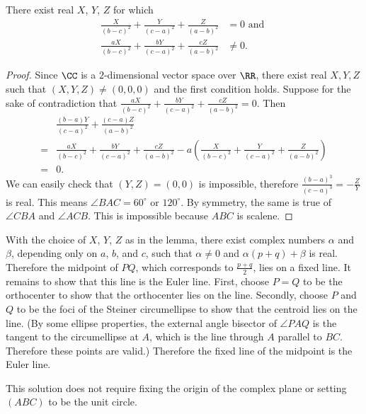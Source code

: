 \begin{lemma*}
  There exist real $X$, $Y$, $Z$ for which
  \begin{align*}
    \frac{X}{(b-c)^2}+\frac{Y}{(c-a)^2}+\frac{Z}{(a-b)^2} &= 0 \text{ and } \\
    \frac{aX}{(b-c)^2}+\frac{bY}{(c-a)^2}+\frac{cZ}{(a-b)^2} &\neq 0.
  \end{align*}
\end{lemma*}

\begin{proof}
  Since $\CC$ is a $2$-dimensional vector space over $\RR$, there
  exist real $X, Y, Z$ such that $(X, Y, Z)\neq (0, 0, 0)$ and the first
  condition holds. Suppose for the sake of contradiction that
  $\frac{aX}{(b-c)^2}+\frac{bY}{(c-a)^2}+\frac{cZ}{(a-b)^2}=0$. Then
  \begin{align*}
    & \frac{(b-a)Y}{(c-a)^2}+\frac{(c-a)Z}{(a-b)^2}\\
    =& \frac{aX}{(b-c)^2}+\frac{bY}{(c-a)^2}+\frac{cZ}{(a-b)^2} -
    a\left(\frac{X}{(b-c)^2}+\frac{Y}{(c-a)^2}+\frac{Z}{(a-b)^2}\right) \\
    =& 0.
  \end{align*}
  We can easily check that $(Y, Z) = (0, 0)$ is impossible, therefore
  $\frac{(b-a)^3}{(c-a)^3} = -\frac{Z}{Y}$ is real.
  This means $\angle BAC = 60^{\circ}$ or $120^{\circ}$.
  By symmetry, the same is true of $\angle CBA$ and $\angle ACB$.
  This is impossible because $ABC$ is scalene.
\end{proof}

With the choice of $X$, $Y$, $Z$ as in the lemma, there exist complex numbers
$\alpha$ and $\beta$, depending only on $a$, $b$, and $c$, such that $\alpha\neq
0$ and $\alpha(p+q)+\beta$ is real. Therefore the midpoint of $PQ$, which
corresponds to $\frac{p+q}{2}$, lies on a fixed line. It remains to show that
this line is the Euler line. First, choose $P=Q$ to be the orthocenter to show
that the orthocenter lies on the line. Secondly, choose $P$ and $Q$ to be the
foci of the Steiner circumellipse to show that the centroid lies on the line.
(By some ellipse properties, the external angle bisector of $\angle PAQ$ is the
tangent to the circumellipse at $A$, which is the line through $A$ parallel to
$BC$. Therefore these points are valid.) Therefore the fixed line of the
midpoint is the Euler line.

\begin{remark*}
  This solution does not require fixing the origin of the complex plane or
  setting $(ABC)$ to be the unit circle.
\end{remark*}

